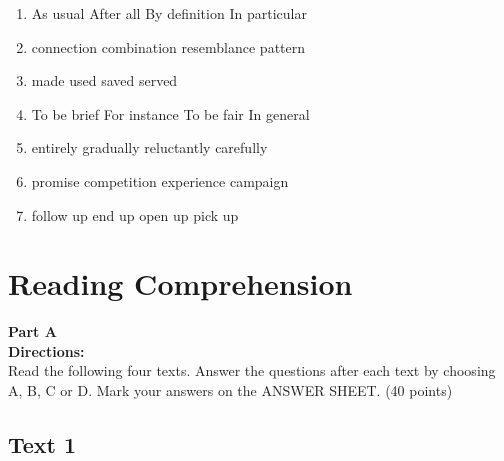 \begin{enumerate}
\item

\fourchoices
{As usual}
{After all}
{By definition}
{In particular}





\item

\fourchoices
{connection}
{combination}
{resemblance}
{pattern}



\item


\fourchoices
{made}
{used}
{saved}
{served}






\item

\fourchoices
{To be brief}
{For instance}
{To be fair}
{In general}


\item

\fourchoices
{entirely}
{gradually}
{reluctantly}
{carefully}



\item

\fourchoices
{promise}
{competition}
{experience}
{campaign}




\item


\fourchoices
{follow up}
{end up}
{open up}
{pick up}

\end{enumerate}

\vfil

\section{Reading Comprehension}




\noindent
\textbf{Part A}\\
\textbf{Directions:}\\
Read the following four texts. Answer the questions after each text by
choosing A, B, C or
D. Mark your answers on the ANSWER SHEET. (40
points)



\newpage
\subsection{Text 1}


